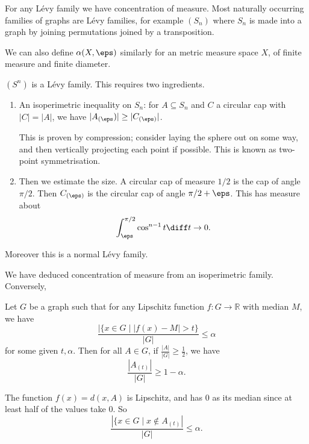 \documentclass[12pt]{article}
\begin{document}
For any L\'evy family we have concentration of measure. Most naturally occurring families of graphs are L\'evy families, for example $(S_n)$ where $S_n$ is made into a graph by joining permutations joined by a transposition.

We can also define $\alpha(X, \eps)$ similarly for an metric measure space $X$, of finite measure and finite diameter.

\begin{exbox}
	$(S^{n})$ is a L\'evy family. This requires two ingredients.
	\begin{enumerate}
		\item An isoperimetric inequality on $S_n$: for $A \subseteq S_n$ and $C$ a circular cap with $|C| = |A|$, we have $|A_{(\eps})| \geq |C_{(\eps)}|$.

			This is proven by compression; consider laying the sphere out on some way, and then vertically projecting each point if possible. This is known as two-point symmetrisation.
		\item Then we estimate the size. A circular cap of measure $1/2$ is the cap of angle $\pi/2$. Then $C_{(\eps)}$ is the circular cap of angle $\pi/2 + \eps$. This has measure about
			\[
			\int_\eps^{\pi/2} \cos^{n-1}t \diff t \to 0.
			\]
	\end{enumerate}
	Moreover this is a normal L\'evy family.
\end{exbox}

We have deduced concentration of measure from an isoperimetric family. Conversely,

\begin{proposition}
	Let $G$ be a graph such that for any Lipschitz function $f : G  \to \mathbb{R}$ with median $M$, we have
	\[
		\frac{|\{x \in G \mid |f(x) - M| > t\}}{|G|} \leq \alpha
	\]
	for some given $t, \alpha$. Then for all $A \in G$, if $\frac{|A|}{|G|} \geq \frac{1}{2}$, we have
	\[
	\frac{|A_{(t)}|}{|G|} \geq 1 - \alpha.
	\]
\end{proposition}

\begin{proofbox}
	The function $f(x) = d(x, A)$ is Lipschitz, and has $0$ as its median since at least half of the values take $0$. So
	\[
	\frac{|\{x \in G \mid x \not \in A_{(t)}|}{|G|} \leq \alpha.
	\]
\end{proofbox}



\newpage

\printindex
\end{document}
